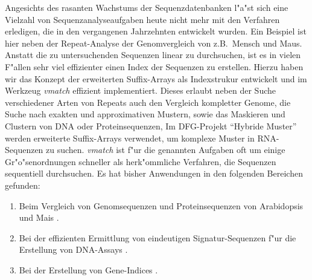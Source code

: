 \documentclass[12pt]{article}
\begin{document}
Angesichts des rasanten Wachstums der Sequenzdatenbanken l"a"st sich
eine Vielzahl von Sequenzanalyseaufgaben heute nicht mehr
mit den Verfahren erledigen, die in den vergangenen Jahrzehnten
entwickelt wurden. Ein Beispiel ist hier neben der Repeat-Analyse
der Genomvergleich von z.B.\ Mensch und Maus.
Anstatt die zu untersuchenden Sequenzen linear zu durchsuchen,
ist es in vielen F"allen sehr viel effizienter einen Index der
Sequenzen zu erstellen.  Hierzu haben wir das Konzept der erweiterten
Suffix-Arrays als Indexstrukur entwickelt \cite{ABO:KUR:OHL:2002} und 
im Werkzeug \emph{vmatch} effizient implementiert. Dieses erlaubt neben
der Suche verschiedener Arten von Repeats auch den
Vergleich kompletter Genome, die Suche nach exakten und approximativen 
Mustern, sowie das Maskieren und Clustern von DNA oder Proteinsequenzen,
Im DFG-Projekt "`Hybride Muster"' werden erweiterte Suffix-Arrays verwendet,
um komplexe Muster in RNA-Sequenzen zu suchen.
\emph{vmatch} ist f"ur die genannten Aufgaben oft um einige Gr"o"senordnungen
schneller als herk"ommliche Verfahren, die Sequenzen sequentiell durchsuchen.
Es hat bisher Anwendungen in den folgenden Bereichen gefunden:
\begin{enumerate}
\item
Beim Vergleich von Genomsequenzen und Proteinsequenzen
von Arabidopsis und Mais \cite{BRE:KUR:WAL:2002}.
\item
Bei der effizienten Ermittlung von eindeutigen Signatur-Sequenzen f"ur die
Erstellung von DNA-Assays \cite{FIT:GAR:KUC:KUR:MYE:OTT:SLE:VIT:ZEM:MCC:2002}.
\item
Bei der Erstellung von Gene-Indices \cite{COW:HAA:VIN:2002}.
\end{enumerate}


\end{document}
